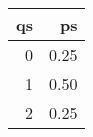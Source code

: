 \begin{tabular}{rr}
\toprule
 qs &    ps \\
\midrule
  0 &  0.25 \\
  1 &  0.50 \\
  2 &  0.25 \\
\bottomrule
\end{tabular}
